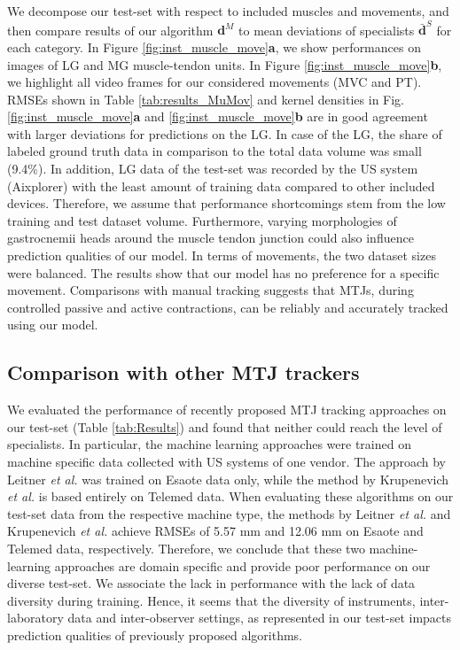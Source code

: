 \documentclass[journal,twoside,web]{ieeecolor}
\begin{document}
We decompose our test-set with respect to included muscles and movements, and then compare results of our algorithm $\boldsymbol{d}^{M}$ to mean deviations of specialists $\bar{\boldsymbol{d}}^{S}$ for each category. In Figure \ref{fig:inst_muscle_move}\textbf{a}, we show performances on images of LG and MG muscle-tendon units. In Figure \ref{fig:inst_muscle_move}\textbf{b}, we highlight all video frames for our considered movements (MVC and PT). RMSEs shown in Table \ref{tab:results_MuMov} and kernel densities in Fig. \ref{fig:inst_muscle_move}\textbf{a} and \ref{fig:inst_muscle_move}\textbf{b} are in good agreement with larger deviations for predictions on the LG. In case of the LG, the share of labeled ground truth data in comparison to the total data volume was small (9.4\%). In addition, LG data of the test-set was recorded by the US system (Aixplorer) with the least amount of training data compared to other included devices. Therefore, we assume that performance shortcomings stem from the low training and test dataset volume. Furthermore, varying morphologies of gastrocnemii heads around the muscle tendon junction could also influence prediction qualities of our model. In terms of movements, the two dataset sizes were balanced. The results show that our model has no preference for a specific movement. Comparisons with manual tracking suggests that MTJs, during controlled passive and active contractions, can be reliably and accurately tracked using our model.

\subsection*{Comparison with other MTJ trackers}
We evaluated the performance of recently proposed MTJ tracking approaches on our test-set (Table \ref{tab:Results}) and found that neither could reach the level of specialists. In particular, the machine learning approaches were trained on machine specific data collected with US systems of one vendor. The approach by Leitner \textit{et al.}\cite{c:LeitnerJarolim2020} was trained on Esaote data only, while the method by Krupenevich \textit{et al.}\cite{j:Krupenevich2021} is based entirely on Telemed data. 
When evaluating these algorithms on our test-set data from the respective machine type, the methods by Leitner \textit{et al.} \cite{c:LeitnerJarolim2020} and Krupenevich \textit{et al.} \cite{j:Krupenevich2021} achieve RMSEs of 5.57 mm and 12.06 mm on Esaote and Telemed data, respectively. Therefore, we conclude that these two machine-learning approaches are domain specific and provide poor performance on our diverse test-set. We associate the lack in performance with the lack of data diversity during training. Hence, it seems that the diversity of instruments, inter-laboratory data and inter-observer settings, as represented in our test-set impacts prediction qualities of previously proposed algorithms.
\end{document}
